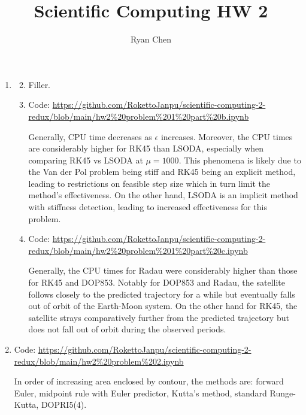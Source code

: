 \documentclass{article}
\title{Scientific Computing HW 2}
\author{Ryan Chen}
\newcommand{\ep}{\epsilon}
\begin{document}
	
\maketitle



\begin{enumerate}
	
	
	
\item

\begin{enumerate}[label=(\alph*)]\setcounter{enumi}{1}
	
	\item Filler.
	
	\item Code: \url{https://github.com/RokettoJanpu/scientific-computing-2-redux/blob/main/hw2%20problem%201%20part%20b.ipynb}
	
	Generally, CPU time decreases as $\ep$ increases. Moreover, the CPU times are considerably higher for RK45 than LSODA, especially when comparing RK45 vs LSODA at $\mu=1000$. This phenomena is likely due to the Van der Pol problem being stiff and RK45 being an explicit method, leading to restrictions on feasible step size which in turn limit the method's effectiveness. On the other hand, LSODA is an implicit method with stiffness detection, leading to increased effectiveness for this problem.
	
	\item Code: \url{https://github.com/RokettoJanpu/scientific-computing-2-redux/blob/main/hw2%20problem%201%20part%20c.ipynb}
	
	Generally, the CPU times for Radau were considerably higher than those for RK45 and DOP853. Notably for DOP853 and Radau, the satellite follows closely to the predicted trajectory for a while but eventually falls out of orbit of the Earth-Moon system. On the other hand for RK45, the satellite strays comparatively further from the predicted trajectory but does not fall out of orbit during the observed periods.
	
\end{enumerate}



\item Code: \url{https://github.com/RokettoJanpu/scientific-computing-2-redux/blob/main/hw2%20problem%202.ipynb}

In order of increasing area enclosed by contour, the methods are: forward Euler, midpoint rule with Euler predictor, Kutta's method, standard Runge-Kutta, DOPRI5(4).


\end{enumerate}
\end{document}
